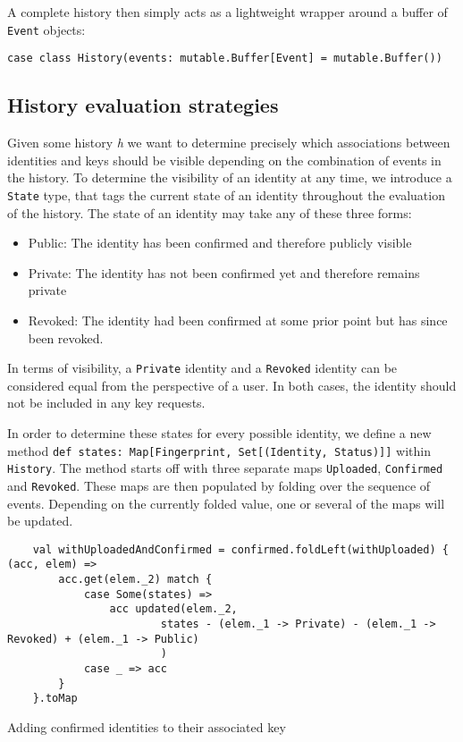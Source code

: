 A complete history then simply acts as a lightweight wrapper around a buffer of \texttt{Event} objects:
\begin{verbatim}
case class History(events: mutable.Buffer[Event] = mutable.Buffer())
\end{verbatim}

\subsection{History evaluation strategies}
Given some history \emph{h} we want to determine precisely which associations between identities and keys should be visible depending on the combination of events in the history.
To determine the visibility of an identity at any time, we introduce a \texttt{State} type, that tags the current state of an identity throughout the evaluation of the history.
The state of an identity may take any of these three forms: 
\begin{itemize}
    \item Public: The identity has been confirmed and therefore publicly visible
    \item Private: The identity has not been confirmed yet and therefore remains private
    \item Revoked: The identity had been confirmed at some prior point but has since been revoked.
\end{itemize}
In terms of visibility, a \texttt{Private} identity and a \texttt{Revoked} identity can be considered equal from the perspective of a user. In both cases, the identity should not be included in any key requests.

In order to determine these states for every possible identity, we define a new method \texttt{def states: Map[Fingerprint, Set[(Identity, Status)]]} within \texttt{History}.
The method starts off with three separate maps \texttt{Uploaded}, \texttt{Confirmed} and \texttt{Revoked}. These maps are then populated by folding over the sequence of events.
Depending on the currently folded value, one or several of the maps will be updated. 

\begin{code}
    \begin{verbatim}
    val withUploadedAndConfirmed = confirmed.foldLeft(withUploaded) { (acc, elem) =>
        acc.get(elem._2) match {
            case Some(states) =>
                acc updated(elem._2, 
                        states - (elem._1 -> Private) - (elem._1 -> Revoked) + (elem._1 -> Public)
                        )
            case _ => acc
        }
    }.toMap
    \end{verbatim}
    \caption{Adding confirmed identities to their associated key}
\end{code}

